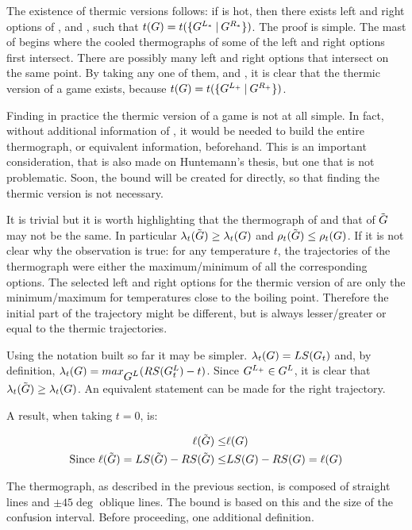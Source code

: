 The existence of thermic versions follows: if \Gm{} is hot, then there exists left and right options of \Gm{},  and , such that \mbox{$t(G) = t(\mbox{$\{\mbox{$G^{L_*}$}\:|\:\mbox{$G^{R_*}$}\}$})$}. The proof is simple. The mast of \Gm{} begins where the cooled thermographs of some of the left and right options first intersect. There are possibly many left and right options that intersect on the same point. By taking any one of them,  and , it is clear that the thermic version of a game exists, because $t(G) = t(\mbox{$\{\mbox{$G^{L_+}$}\:|\:\mbox{$G^{R_+}$}\}$})$.

Finding in practice the thermic version of a game is not at all simple. In fact, without additional information of \Gm{}, it would be needed to build the entire thermograph, or equivalent information, beforehand. This is an important consideration, that is also made on Huntemann's thesis, but one that is not problematic. Soon, the bound will be created for \Gm{} directly, so that finding the thermic version is not necessary.

It is trivial but it is worth highlighting that the thermograph of \Gm{} and that of $\tilde{\mbox{$G$}}$ may not be the same. In particular $\lambda_t(\tilde{\mbox{$G$}}) \ge \lambda_t(\mbox{$G$})$ and $\rho_t(\tilde{\mbox{$G$}}) \leq \rho_t(\mbox{$G$})$. If it is not clear why the observation is true: for any temperature $t$, the trajectories of the thermograph were either the maximum/minimum of all the corresponding options. The selected left and right options for the thermic version of \Gm{} are only the minimum/maximum for temperatures close to the boiling point. Therefore the initial part of the trajectory might be different, but is always lesser/greater or equal to the thermic trajectories.

Using the notation built so far it may be simpler. $\lambda_t(\mbox{$G$}) = LS(\mbox{$G_t$})$ and, by definition, $\lambda_t(\mbox{$G$}) = max_{\mbox{$G^L$}}(RS(\mbox{$G^L_t$}) - t)$. Since $\mbox{$G^{L_+}$} \in \mbox{$G^L$}$, it is clear that $\lambda_t(\tilde{\mbox{$G$}}) \ge \lambda_t(\mbox{$G$})$. An equivalent statement can be made for the right trajectory.

A result, when taking $t=0$, is:

\begin{align*}
\ell(\tilde{\mbox{$G$}}) \leq& \ell(\mbox{$G$})\\
\text{Since } \ell(\tilde{\mbox{$G$}}) = LS(\tilde{\mbox{$G$}}) - RS(\tilde{\mbox{$G$}})\leq& LS(\mbox{$G$}) - RS(\mbox{$G$}) = \ell(\mbox{$G$})
\end{align*}

The thermograph, as described in the previous section, is composed of straight lines and $\pm 45 \deg$ oblique lines. The bound is based on this and the size of the confusion interval. Before proceeding, one additional definition.

